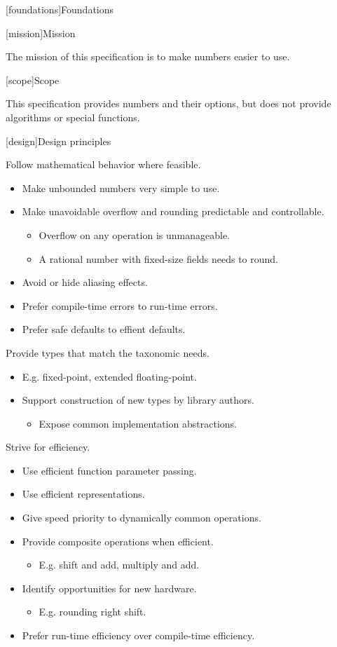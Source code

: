 
[foundations]{Foundations}

[mission]{Mission}

The mission of this specification is to make numbers easier to use.

[scope]{Scope}

This specification provides numbers and their options, but does not provide algorithms or special functions.

[design]{Design principles}

Follow mathematical behavior where feasible.

\begin{itemize}
\item Make unbounded numbers very simple to use.
\item Make unavoidable overflow and rounding predictable and controllable.
\begin{itemize}
\item Overflow on any operation is unmanageable.
\item A rational number with fixed-size fields needs to round.
\end{itemize}
\item Avoid or hide aliasing effects.
\item Prefer compile-time errors to run-time errors.
\item Prefer safe defaults to effient defaults.
\end{itemize}

Provide types that match the taxonomic needs.

\begin{itemize}
\item E.g. fixed-point, extended floating-point.
\item Support construction of new types by library authors.
\begin{itemize}
\item Expose common implementation abstractions.
\end{itemize}	
\end{itemize}

Strive for efficiency.

\begin{itemize}
\item Use efficient function parameter passing.
\item Use efficient representations.
\item Give speed priority to dynamically common operations.
\item Provide composite operations when efficient.
\begin{itemize}
\item E.g. shift and add, multiply and add.
\end{itemize}
\item Identify opportunities for new hardware.
\begin{itemize}
\item E.g. rounding right shift.
\end{itemize}
\item Prefer run-time efficiency over compile-time efficiency.
\end{itemize}

